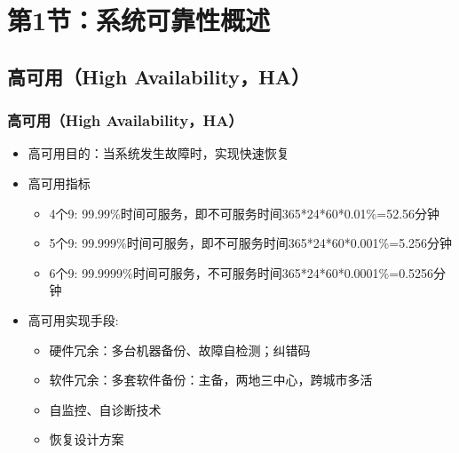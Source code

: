 \section{第1节：系统可靠性概述} %
\subsection{高可用（High Availability，HA）} %
\begin{frame}[fragile]
    \frametitle{高可用（High Availability，HA）}
\begin{itemize}
    \item 高可用目的：当系统发生故障时，实现快速恢复 \pause
    \item 高可用指标
\begin{itemize}
    \item 4个9: 99.99\%时间可服务，即不可服务时间365*24*60*0.01\%=52.56分钟
    \item 5个9: 99.999\%时间可服务，即不可服务时间365*24*60*0.001\%=5.256分钟
    \item 6个9: 99.9999\%时间可服务，不可服务时间365*24*60*0.0001\%=0.5256分钟
\end{itemize} \pause
    \item 高可用实现手段: 
 \begin{itemize}
    \item 硬件冗余：多台机器备份、故障自检测；纠错码
    \item 软件冗余：多套软件备份：主备，两地三中心，跨城市多活
    \item 自监控、自诊断技术
    \item 恢复设计方案
\end{itemize} 
\end{itemize}
\end{frame}


